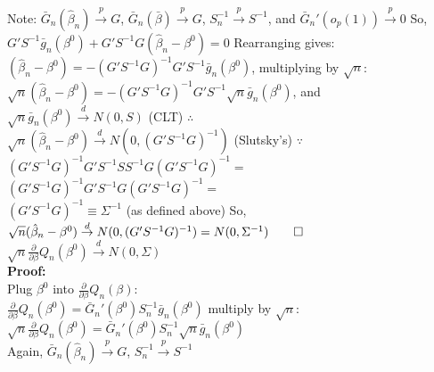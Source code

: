 \documentclass[11pt]{article}
\theoremstyle{definition}
\newcommand*\circled[1]{\tikz[baseline=(char.base)]{
            \node[shape=circle,draw,inner sep=2pt] (char) {#1};}}
\def\inprob{\stackrel{p}{\rightarrow}}
\def\indist{\stackrel{d}{\rightarrow}}
\begin{document}
Note: $\bar{G}_{n}(\hat{\beta}_{n}) \inprob G$, $\bar{G}_{n}(\bar{\beta}) \inprob G$, $S_{n}^{-1} \inprob S^{-1}$, and $\bar{G}_{n}'(o_{p}(1)) \inprob 0$ So, \\

$G'S^{-1}\bar{g}_{n}(\beta^{0})+ G'S^{-1}G(\hat{\beta}_{n}-\beta^{0})=0$ Rearranging gives: \\

$(\hat{\beta}_{n}-\beta^{0})=-\left(G'S^{-1}G\right)^{-1}G'S^{-1}\bar{g}_{n}(\beta^{0})$, multiplying by $\sqrt{n}$: \\

$\sqrt{n}(\hat{\beta}_{n}-\beta^{0})=-\left(G'S^{-1}G\right)^{-1}G'S^{-1}\sqrt{n}\bar{g}_{n}(\beta^{0})$, and \\

$\sqrt{n}\bar{g}_{n}(\beta^{0}) \indist N(0,S)$ (CLT) $\therefore$ \\

$\sqrt{n}(\hat{\beta}_{n}-\beta^{0}) \indist N(0,(G'S^{-1}G)^{-1})$ (Slutsky's) $\because$ \\

$(G'S^{-1}G)^{-1}G'S^{-1}SS^{-1}G(G'S^{-1}G)^{-1}=$ \\

$(G'S^{-1}G)^{-1}G'S^{-1}G(G'S^{-1}G)^{-1}=$ \\

$(G'S^{-1}G)^{-1}\equiv \Sigma^{-1}$ (as defined above) So, \\

$\sqrt{n}(\hat{\beta}_{n}-\beta^{0}) \indist N(0,(G'S^{-1}G)^{-1})=N(0,\Sigma^{-1}) \qed$ \\

\noindent
\circled{B} $\sqrt{n}\frac{\partial}{\partial \beta}Q_{n}(\beta^{0}) \indist N(0,\Sigma)$ \\

\textbf{Proof:} \\

Plug $\beta^{0}$ into $\frac{\partial}{\partial \beta}Q_{n}(\beta)$: \\

$\frac{\partial}{\partial \beta}Q_{n}(\beta^{0})=\bar{G}_{n}'(\beta^{0})S_{n}^{-1}\bar{g}_{n}(\beta^{0})$ multiply by $\sqrt{n}$: \\

$\sqrt{n}\frac{\partial}{\partial \beta}Q_{n}(\beta^{0})=\bar{G}_{n}'(\beta^{0})S_{n}^{-1}\sqrt{n}\bar{g}_{n}(\beta^{0})$ \\

Again, $\bar{G}_{n}(\hat{\beta}_{n}) \inprob G$, $S_{n}^{-1} \inprob S^{-1}$ \\
\end{document}
